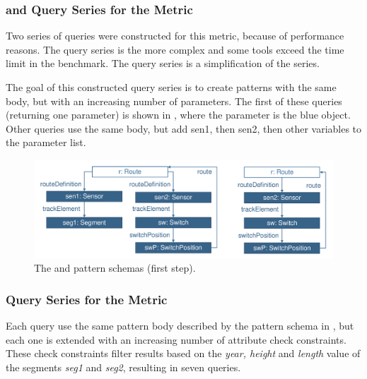 \subsubsection{ and  Query Series for the
 Metric} Two series of queries were constructed for this
metric, because of performance reasons. The  query series is the more
complex and some tools exceed the time limit in the benchmark. The
 query series is a simplification of the 
series.

The goal of this constructed query series is to create patterns with the same
body, but with an increasing number of parameters. The first of these queries
(returning one parameter) is shown in , where the
parameter is the blue object. Other queries use the same body, but add sen1,
then sen2, then other variables to the parameter list.

\begin{figure}[htb]
\begin{center}
    \includegraphics[scale=0.4]{figures/parameters.pdf}
    \caption{The  and  pattern schemas (first step).}
    \label{fig:aseparams}
\end{center}
\end{figure}



\subsubsection{ Query Series for the  Metric}
Each  query use the same pattern body described by the pattern
schema in , but each one is extended with an increasing
number of attribute check constraints. These check constraints filter results
based on the \emph{year, height} and \emph{length} value of the segments \emph{seg1} and
\emph{seg2}, resulting in seven queries.

